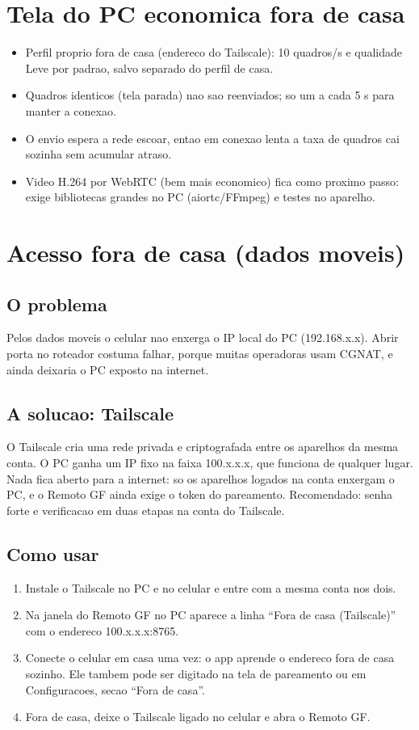 \documentclass[11pt,a4paper]{article}
\begin{document}
\section{Tela do PC economica fora de casa}
\begin{itemize}
  \item Perfil proprio fora de casa (endereco do Tailscale): 10 quadros/s e qualidade Leve por
  padrao, salvo separado do perfil de casa.
  \item Quadros identicos (tela parada) nao sao reenviados; so um a cada 5 s para manter a
  conexao.
  \item O envio espera a rede escoar, entao em conexao lenta a taxa de quadros cai sozinha sem
  acumular atraso.
  \item Video H.264 por WebRTC (bem mais economico) fica como proximo passo: exige
  bibliotecas grandes no PC (aiortc/FFmpeg) e testes no aparelho.
\end{itemize}

\section{Acesso fora de casa (dados moveis)}
\label{sec:fora}

\subsection{O problema}
Pelos dados moveis o celular nao enxerga o IP local do PC (192.168.x.x). Abrir porta no
roteador costuma falhar, porque muitas operadoras usam CGNAT, e ainda deixaria o PC exposto
na internet.

\subsection{A solucao: Tailscale}
O Tailscale cria uma rede privada e criptografada entre os aparelhos da mesma conta. O PC
ganha um IP fixo na faixa 100.x.x.x, que funciona de qualquer lugar. Nada fica aberto para a
internet: so os aparelhos logados na conta enxergam o PC, e o Remoto GF ainda exige o token
do pareamento. Recomendado: senha forte e verificacao em duas etapas na conta do Tailscale.

\subsection{Como usar}
\begin{enumerate}
  \item Instale o Tailscale no PC e no celular e entre com a mesma conta nos dois.
  \item Na janela do Remoto GF no PC aparece a linha ``Fora de casa (Tailscale)'' com o
  endereco 100.x.x.x:8765.
  \item Conecte o celular em casa uma vez: o app aprende o endereco fora de casa sozinho.
  Ele tambem pode ser digitado na tela de pareamento ou em Configuracoes, secao
  ``Fora de casa''.
  \item Fora de casa, deixe o Tailscale ligado no celular e abra o Remoto GF.
\end{enumerate}
\end{document}
